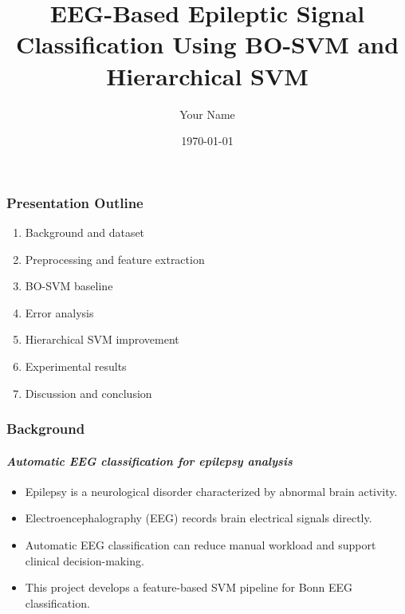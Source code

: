 \documentclass{beamer}
\begin{document}

\title[BO-SVM EEG Classification]{EEG-Based Epileptic Signal Classification Using BO-SVM and Hierarchical SVM}
\author{Your Name}
\date{\today}

\begin{frame}
\titlepage
\end{frame}

\begin{frame}
\frametitle{Presentation Outline}
\begin{enumerate}
\item Background and dataset
\item Preprocessing and feature extraction
\item BO-SVM baseline
\item Error analysis
\item Hierarchical SVM improvement
\item Experimental results
\item Discussion and conclusion
\end{enumerate}
\end{frame}

\begin{frame}
\frametitle{Background}
\framesubtitle{\it{Automatic EEG classification for epilepsy analysis}}
\begin{itemize}
\item Epilepsy is a neurological disorder characterized by abnormal brain activity.
\item Electroencephalography (EEG) records brain electrical signals directly.
\item Automatic EEG classification can reduce manual workload and support clinical decision-making.
\item This project develops a feature-based SVM pipeline for Bonn EEG classification.
\end{itemize}
\end{frame}
\end{document}
